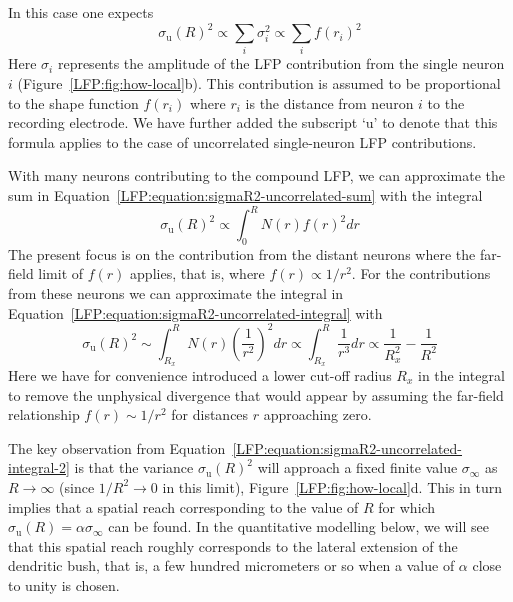 In this case one expects \cite{Linden2011}
\begin{equation}
\sigma_\text{u}(R)^2 \propto \sum_i \sigma_i^2 \propto \sum_i f(r_i)^2
\label{LFP:equation:sigmaR2-uncorrelated-sum}
\end{equation}
Here $\sigma_i$ represents the amplitude of the LFP contribution from the single 
neuron $i$ (Figure~\ref{LFP:fig:how-local}b). This contribution is assumed to 
be proportional to the shape function $f(r_i)$ where $r_i$ is the distance from neuron $i$ to the recording electrode.  
We have further added the subscript `u' to denote that this formula applies to the case of uncorrelated single-neuron LFP contributions.

With many neurons contributing to the compound LFP, we can approximate the sum in Equation~\ref{LFP:equation:sigmaR2-uncorrelated-sum}
with the integral  
\begin{equation}
\sigma_\text{u}(R)^2 \propto \int_0^R N(r) f(r)^2 dr 
\label{LFP:equation:sigmaR2-uncorrelated-integral}
\end{equation}
The present focus is on the contribution from the distant neurons where the far-field limit of $f(r)$ applies, that is, where $f(r) \propto 1/r^2$.
For the contributions from these neurons we can approximate the integral in Equation~\ref{LFP:equation:sigmaR2-uncorrelated-integral}
with 
\begin{equation}
\sigma_\text{u}(R)^2 \sim \int_{R_x}^R N(r) \left(\frac{1}{r^2}\right)^2 dr \propto \int_{R_x}^R \frac{1}{r^3} dr
\propto \frac{1}{R_x^2}-\frac{1}{R^2}
\label{LFP:equation:sigmaR2-uncorrelated-integral-2}
\end{equation}
Here we have for convenience introduced a lower cut-off radius $R_x$ in the integral to remove the unphysical divergence that would appear by
assuming the far-field relationship $f(r)\sim 1/r^2$ for distances $r$ approaching zero.

The key observation from Equation~\ref{LFP:equation:sigmaR2-uncorrelated-integral-2} is that the variance $\sigma_\text{u}(R)^2$ 
will approach a fixed finite value $\sigma_\infty$ as $R \rightarrow \infty$ (since $1/R^2 \rightarrow 0$ in this limit), Figure~\ref{LFP:fig:how-local}d.
This in turn implies that a spatial reach corresponding to the value of $R$ for which $\sigma_\text{u}(R)=\alpha \sigma_\infty$ can be found.
In the quantitative modelling below, we will see that this spatial reach roughly corresponds to the lateral extension of the dendritic bush, that is, a few hundred micrometers or so when a value of $\alpha$ close to unity is chosen.

